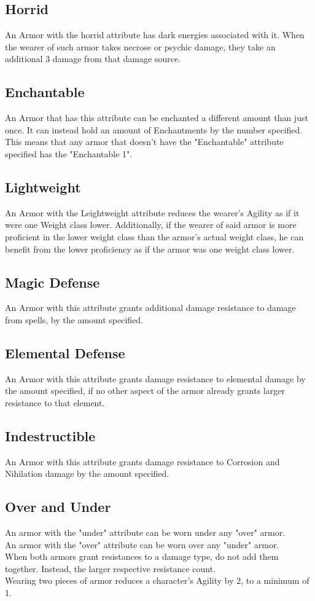 \subsection{Horrid}\label{armor:horrid}
An Armor with the horrid attribute has dark energies associated with it.
When the wearer of such armor takes necrose or psychic damage, they take an additional 3 damage from that damage source.

\subsection{Enchantable}\label{armor:enchantable}
An Armor that has this attribute can be enchanted a different amount than just once.
It can instead hold an amount of Enchantments by the number specified.
This means that any armor that doesn't have the "Enchantable" attribute specified has the "Enchantable 1".

\subsection{Lightweight}\label{armor:lightweight}
An Armor with the Leightweight attribute reduces the wearer's Agility as if it were one Weight class lower.
Additionally, if the wearer of said armor is more proficient in the lower weight class than the armor's actual weight class, he can benefit from the lower proficiency as if the armor was one weight class lower.

\subsection{Magic Defense}\label{armor:magicDefense}
An Armor with this attribute grants additional damage resistance to damage from spells, by the amount specified.

\subsection{Elemental Defense}\label{armor:elementalDefense}
An Armor with this attribute grants damage resistance to elemental damage by the amount specified, if no other aspect of the armor already grants larger resistance to that element.

\subsection{Indestructible}\label{armor:indestructible}
An Armor with this attribute grants damage resistance to Corrosion and Nihilation damage by the amount specified.

\subsection{Over and Under}\label{armor:under}
An armor with the "under" attribute can be worn under any "over" armor.\\
An armor with the "over" attribute can be worn over any "under" armor.\\
When both armors grant resistances to a damage type, do not add them together.
Instead, the larger respective resistance count.\\
Wearing two pieces of armor reduces a character's Agility by 2, to a minimum of 1.